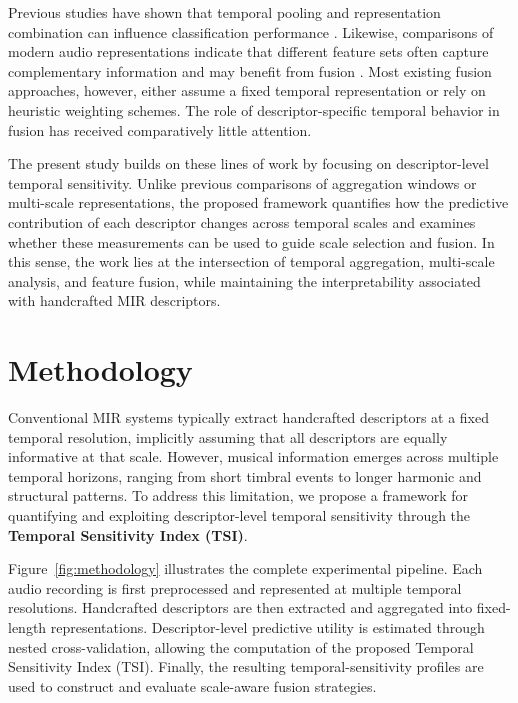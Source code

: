 \documentclass[runningheads]{llncs}
\begin{document}
Previous studies have shown that temporal pooling and representation combination can influence classification performance \cite{hamel2011temporal}. Likewise, comparisons of modern audio representations indicate that different feature sets often capture complementary information and may benefit from fusion \cite{tamm2024comparative,ding2023audio}. Most existing fusion approaches, however, either assume a fixed temporal representation or rely on heuristic weighting schemes. The role of descriptor-specific temporal behavior in fusion has received comparatively little attention.

The present study builds on these lines of work by focusing on descriptor-level temporal sensitivity. Unlike previous comparisons of aggregation windows or multi-scale representations, the proposed framework quantifies how the predictive contribution of each descriptor changes across temporal scales and examines whether these measurements can be used to guide scale selection and fusion. In this sense, the work lies at the intersection of temporal aggregation, multi-scale analysis, and feature fusion, while maintaining the interpretability associated with handcrafted MIR descriptors.



\section{Methodology}

Conventional MIR systems typically extract handcrafted descriptors at a fixed temporal resolution, implicitly assuming that all descriptors are equally informative at that scale. However, musical information emerges across multiple temporal horizons, ranging from short timbral events to longer harmonic and structural patterns. To address this limitation, we propose a framework for quantifying and exploiting descriptor-level temporal sensitivity through the \textbf{Temporal Sensitivity Index (TSI)}. 

Figure~\ref{fig:methodology} illustrates the complete experimental pipeline. Each audio recording is first preprocessed and represented at multiple temporal resolutions. Handcrafted descriptors are then extracted and aggregated into fixed-length representations. Descriptor-level predictive utility is estimated through nested cross-validation, allowing the computation of the proposed Temporal Sensitivity Index (TSI). Finally, the resulting temporal-sensitivity profiles are used to construct and evaluate scale-aware fusion strategies.
\end{document}
